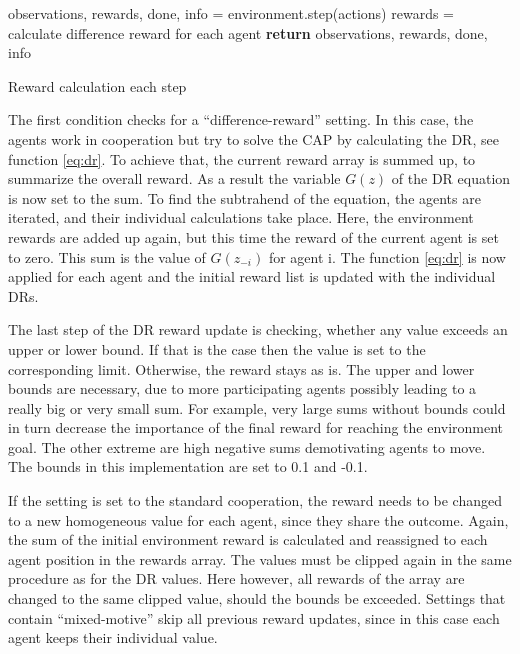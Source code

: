 \begin{algorithm}[H]
    \DontPrintSemicolon
    observations, rewards, done, info = environment.step(actions)\;
    \;
     {
        rewards = calculate difference reward for each agent
    }
    \;
    \;
    \;
    \textbf{return} observations, rewards, done, info\;
    \caption{Reward calculation each step}\label{algo:step_reward}
\end{algorithm}

The first condition checks for a ``difference-reward'' setting. In this case, the agents work in cooperation but try to solve the CAP by calculating the DR, see function \eqref{eq:dr}. To achieve that, the current reward array is summed up, to summarize the overall reward. As a result the variable $G(z)$ of the DR equation is now set to the sum. To find the subtrahend of the equation, the agents are iterated, and their individual calculations take place. Here, the environment rewards are added up again, but this time the reward of the current agent is set to zero. This sum is the value of $G(z_{-i})$ for agent i. The function \eqref{eq:dr} is now applied for each agent and the initial reward list is updated with the individual DRs. 

The last step of the DR reward update is checking, whether any value exceeds an upper or lower bound. If that is the case then the value  is set to the corresponding limit. Otherwise, the reward stays as is. The upper and lower bounds are necessary, due to more participating agents possibly leading to a really big or very small sum. For example, very large sums without bounds could in turn decrease the importance of the final reward for reaching the environment goal. The other extreme are high negative sums demotivating agents to move. The bounds in this implementation are set to 0.1 and -0.1.

If the setting is set to the standard cooperation, the reward needs to be changed to a new homogeneous value for each agent, since they share the outcome. Again, the sum of the initial environment reward is calculated and reassigned to each agent position in the rewards array. The values must be clipped again in the same procedure as for the DR values. Here however, all rewards of the array are changed to the same clipped value, should the bounds be exceeded. Settings that contain ``mixed-motive'' skip all previous reward updates, since in this case each agent keeps their individual value.


